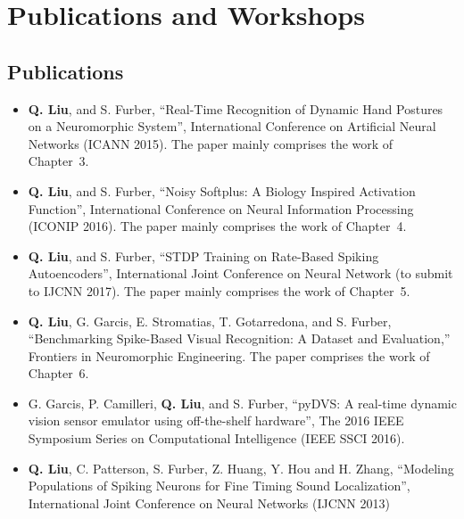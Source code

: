    
\section{Publications and Workshops}
\subsection{Publications}
\begin{itemize}
	\item 
	\textbf{Q. Liu}, and S. Furber, “Real-Time Recognition of Dynamic Hand Postures on a Neuromorphic System”, International Conference on Artificial Neural Networks (ICANN 2015).
	The paper mainly comprises the work of Chapter~3.
	
	\item 
	\textbf{Q. Liu}, and S. Furber, “Noisy Softplus: A Biology Inspired Activation Function”, International Conference on Neural Information Processing (ICONIP 2016). 
	The paper mainly comprises the work of Chapter~4.
	
	
	\item 
	\textbf{Q. Liu}, and S. Furber, “STDP Training on Rate-Based Spiking Autoencoders”, International Joint Conference on Neural Network (to submit to IJCNN 2017).
	The paper mainly comprises the work of Chapter~5.
	
	\item 
	\textbf{Q. Liu}, G. Garcis, E. Stromatias, T. Gotarredona, and S. Furber, “Benchmarking Spike-Based Visual Recognition: A Dataset and Evaluation,” Frontiers in Neuromorphic Engineering.
	The paper comprises the work of Chapter~6.
	

	\item 
	G. Garcis, P. Camilleri, \textbf{Q. Liu}, and S. Furber, “pyDVS: A real-time dynamic vision sensor emulator using off-the-shelf hardware”, The 2016 IEEE Symposium Series on Computational Intelligence (IEEE SSCI 2016).
	
	\item
	\textbf{Q. Liu}, C. Patterson, S. Furber, Z. Huang, Y. Hou and H. Zhang, “Modeling Populations of Spiking Neurons for Fine Timing Sound Localization”, International Joint Conference on Neural Networks (IJCNN 2013)
\end{itemize}	

